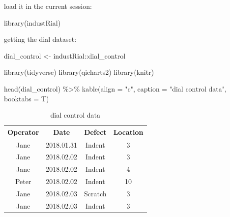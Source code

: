 \documentclass[
]{book}
\newenvironment{Shaded}{\begin{snugshade}}{\end{snugshade}}
\newcommand{\AttributeTok}[1]{\textcolor[rgb]{0.77,0.63,0.00}{#1}}
\newcommand{\FunctionTok}[1]{\textcolor[rgb]{0.00,0.00,0.00}{#1}}
\newcommand{\NormalTok}[1]{#1}
\newcommand{\OtherTok}[1]{\textcolor[rgb]{0.56,0.35,0.01}{#1}}
\newcommand{\SpecialCharTok}[1]{\textcolor[rgb]{0.00,0.00,0.00}{#1}}
\newcommand{\StringTok}[1]{\textcolor[rgb]{0.31,0.60,0.02}{#1}}
\begin{document}
load it in the current session:

\begin{Shaded}
\begin{Highlighting}[]
\FunctionTok{library}\NormalTok{(industRial)}
\end{Highlighting}
\end{Shaded}

getting the dial dataset:

\begin{Shaded}
\begin{Highlighting}[]
\NormalTok{dial\_control }\OtherTok{\textless{}{-}}\NormalTok{  industRial}\SpecialCharTok{::}\NormalTok{dial\_control}
\end{Highlighting}
\end{Shaded}

\begin{Shaded}
\begin{Highlighting}[]
\FunctionTok{library}\NormalTok{(tidyverse)}
\FunctionTok{library}\NormalTok{(qicharts2)}
\FunctionTok{library}\NormalTok{(knitr)}
\end{Highlighting}
\end{Shaded}

\begin{Shaded}
\begin{Highlighting}[]
\FunctionTok{head}\NormalTok{(dial\_control) }\SpecialCharTok{\%\textgreater{}\%} 
  \FunctionTok{kable}\NormalTok{(}\AttributeTok{align =} \StringTok{"c"}\NormalTok{, }
        \AttributeTok{caption =} \StringTok{"dial control data"}\NormalTok{, }
        \AttributeTok{booktabs =}\NormalTok{ T)}
\end{Highlighting}
\end{Shaded}

\begin{table}

\caption{\label{tab:tab-dial}dial control data}
\centering
\begin{tabular}[t]{cccc}
\toprule
Operator & Date & Defect & Location\\
\midrule
Jane & 2018.01.31 & Indent & 3\\
Jane & 2018.02.02 & Indent & 3\\
Jane & 2018.02.02 & Indent & 4\\
Peter & 2018.02.02 & Indent & 10\\
Jane & 2018.02.03 & Scratch & 3\\
\addlinespace
Jane & 2018.02.03 & Indent & 3\\
\bottomrule
\end{tabular}
\end{table}
\end{document}

